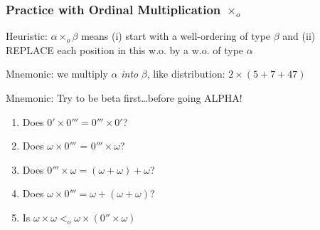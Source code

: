 \begin{frame}
\frametitle{Practice with Ordinal Multiplication $\times_o$}
\bi

\item Heuristic: $\alpha \times_o \beta$ means (i) start with a well-ordering of type $\beta$ and (ii) REPLACE each position in this w.o. by a w.o. of type $\alpha$ 

\item Mnemonic: we multiply $\alpha$ \textit{into} $\beta$, like distribution: $2 \times (5+7+47)$

\item Mnemonic: Try to be beta first\dots before going ALPHA! 
\ei

\begin{enumerate}[<+->]

\item Does \(0' \times 0''' = 0''' \times 0'\)? 

\item Does $\omega \times 0'''$ = $0''' \times \omega$?

\item Does \(0''' \times \omega = (\omega + \omega) + \omega\)?

\item Does \(\omega \times 0''' = \omega + (\omega + \omega)\)?

\item Is \(\omega \times \omega <_o \omega \times (0'' \times \omega)\)


\end{enumerate}
\end{frame}

